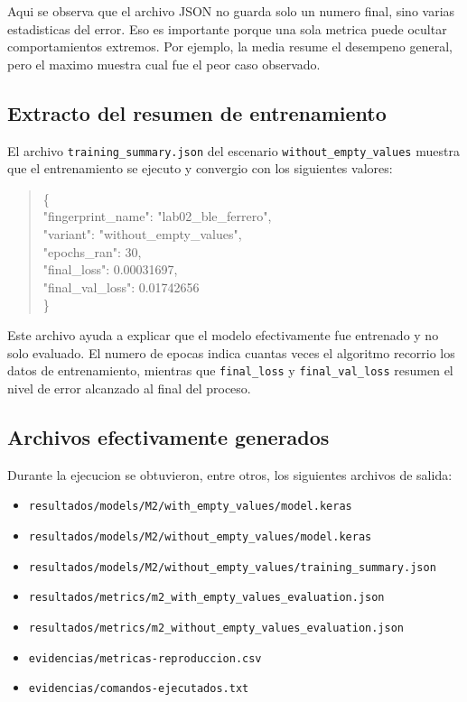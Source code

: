 \documentclass[11pt,a4paper]{article}
\begin{document}
Aqui se observa que el archivo JSON no guarda solo un numero final, sino varias estadisticas del error. Eso es importante porque una sola metrica puede ocultar comportamientos extremos. Por ejemplo, la media resume el desempeno general, pero el maximo muestra cual fue el peor caso observado.

\subsection*{Extracto del resumen de entrenamiento}
El archivo \texttt{training\_summary.json} del escenario \texttt{without\_empty\_values} muestra que el entrenamiento se ejecuto y convergio con los siguientes valores:

\begin{quote}
\ttfamily\footnotesize
\{\\
"fingerprint\_name": "lab02\_ble\_ferrero",\\
"variant": "without\_empty\_values",\\
"epochs\_ran": 30,\\
"final\_loss": 0.00031697,\\
"final\_val\_loss": 0.01742656\\
\}
\end{quote}

Este archivo ayuda a explicar que el modelo efectivamente fue entrenado y no solo evaluado. El numero de epocas indica cuantas veces el algoritmo recorrio los datos de entrenamiento, mientras que \texttt{final\_loss} y \texttt{final\_val\_loss} resumen el nivel de error alcanzado al final del proceso.

\subsection*{Archivos efectivamente generados}
Durante la ejecucion se obtuvieron, entre otros, los siguientes archivos de salida:
\begin{itemize}
\item \texttt{resultados/models/M2/with\_empty\_values/model.keras}
\item \texttt{resultados/models/M2/without\_empty\_values/model.keras}
\item \texttt{resultados/models/M2/without\_empty\_values/training\_summary.json}
\item \texttt{resultados/metrics/m2\_with\_empty\_values\_evaluation.json}
\item \texttt{resultados/metrics/m2\_without\_empty\_values\_evaluation.json}
\item \texttt{evidencias/metricas-reproduccion.csv}
\item \texttt{evidencias/comandos-ejecutados.txt}
\end{itemize}
\end{document}
